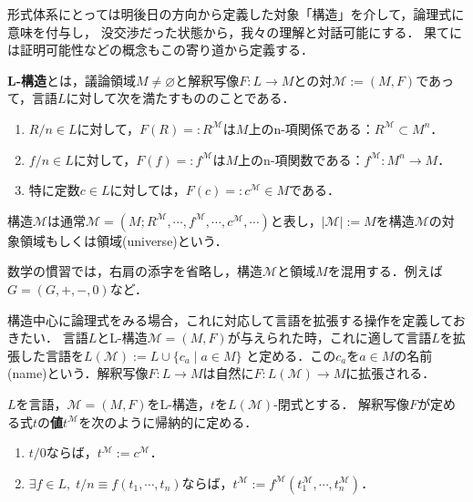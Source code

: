 \documentclass[uplatex, dvipdfmx]{jsreport}
\begin{document}
\begin{screen}
    形式体系にとっては明後日の方向から定義した対象「構造」を介して，論理式に意味を付与し，
    没交渉だった状態から，我々の理解と対話可能にする．
    果てには証明可能性などの概念もこの寄り道から定義する．
\end{screen}

\begin{definition}[structure]
    \textbf{L-構造}とは，議論領域$M\ne\varnothing$と解釈写像$F:L\to M$との対$\mathcal{M}:=(M,F)$であって，言語$L$に対して次を満たすもののことである．
    \begin{enumerate}
        \item $R/n\in L$に対して，$F(R)=:R^\mathcal{M}$は$M$上のn-項関係である：$R^\mathcal{M}\subset M^n$．
        \item $f/n\in L$に対して，$F(f)=:f^\mathcal{M}$は$M$上のn-項関数である：$f^\mathcal{M}:M^n\to M$．
        \item 特に定数$c\in L$に対しては，$F(c)=:c^\mathcal{M}\in M$である．
    \end{enumerate}
    構造$\mathcal{M}$は通常$\mathcal{M}=(M;R^\mathcal{M},\cdots,f^\mathcal{M},\cdots,c^\mathcal{M},\cdots)$と表し，$|\mathcal{M}|:=M$を構造$\mathcal{M}$の対象領域もしくは領域(universe)という．
\end{definition}
\begin{remark}
    数学の慣習では，右肩の添字を省略し，構造$\mathcal{M}$と領域$M$を混用する．例えば$G=(G,+,-,0)$など．
\end{remark}

構造中心に論理式をみる場合，これに対応して言語を拡張する操作を定義しておきたい．
言語$L$とL-構造$\mathcal{M}=(M,F)$が与えられた時，これに適して言語$L$を拡張した言語を$L(\mathcal{M}):=L\cup\{c_a\mid a\in M\}$
と定める．この$c_a$を$a\in M$の名前(name)という．解釈写像$F:L\to M$は自然に$F:L(\mathcal{M})\to M$に拡張される．

\begin{definition}
    $L$を言語，$\mathcal{M}=(M,F)$をL-構造，$t$を$L(\mathcal{M})$-閉式とする．
    解釈写像$F$が定める式$t$の\textbf{値}$t^\mathcal{M}$を次のように帰納的に定める．
    \begin{enumerate}
        \item $t/0$ならば，$t^\mathcal{M}:=c^\mathcal{M}$．
        \item $\exists f\in L,\; t/n\equiv f(t_1,\cdots,t_n)$ならば，$t^\mathcal{M}:=f^\mathcal{M}(t^\mathcal{M}_1,\cdots,t^\mathcal{M}_n)$．
    \end{enumerate}
\end{definition}
\end{document}
